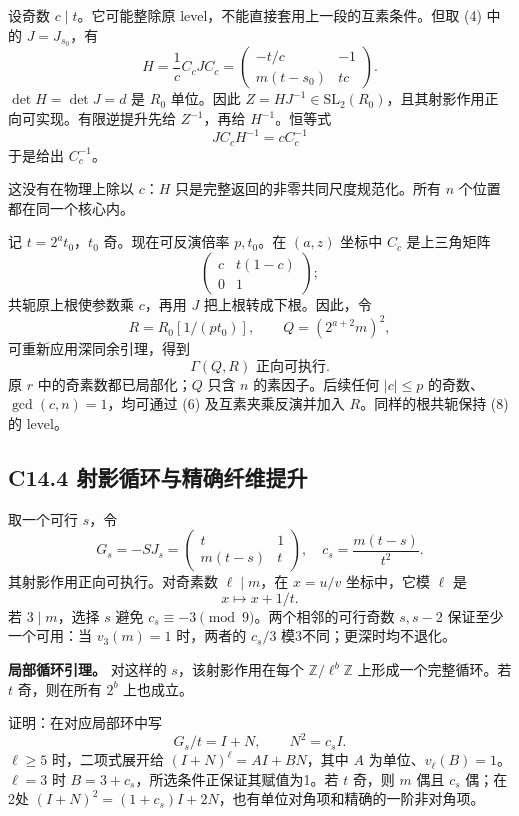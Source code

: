 \documentclass[11pt,a4paper]{article}
\theoremstyle{definition}
\numberwithin{equation}{section}
\begin{document}
{设奇数} \(c\mid t\){。它可能整除原} {level，不能直接套用上一段的互素条件。但取} {(4)} {中的} \(J=J_{s_0}\){，有} \[
H=\frac1c C_cJC_c
=\begin{pmatrix}-t/c&-1\\m(t-s_0)&tc\end{pmatrix}.
\] \(\det H=\det J=d\) {是} \(R_0\) {单位。因此} \(Z=HJ^{-1}\in\mathrm{SL}_2(R_0)\){，且其射影作用正向可实现。有限逆提升先给} \(Z^{-1}\){，再给} \(H^{-1}\){。恒等式} \[
JC_cH^{-1}=cC_c^{-1}\tag{C14.7}
\] {于是给出} \(C_c^{-1}\){。}

{这没有在物理上除以} \(c\){：}\(H\) {只是完整返回的非零共同尺度规范化。所有} \(n\) {个位置都在同一个核心内。}

{记} \(t=2^a t_0\){，}\(t_0\) {奇。现在可反演倍率} \(p,t_0\){。在} \((a,z)\) {坐标中} \(C_c\) {是上三角矩阵} \[
\begin{pmatrix}c&t(1-c)\\0&1\end{pmatrix};
\] {共轭原上根使参数乘} \(c\){，再用} \(J\) {把上根转成下根。因此，令} \[
R=R_0[1/(pt_0)],\qquad Q=(2^{a+2}m)^2,
\] {可重新应用深同余引理，得到} \[
\boxed{\Gamma(Q,R)\text{ 正向可执行}.}\tag{C14.8}
\] {原} \(r\) {中的奇素数都已局部化；}\(Q\) {只含} \(n\) {的素因子。后续任何} \(|c|\le p\) {的奇数、}\(\gcd(c,n)=1\){，均可通过} {(6)} {及互素夹乘反演并加入} \(R\){。同样的根共轭保持} {(8)} {的} {level。}

\subsection*{\texorpdfstring{{C14.4} {射影循环与精确纤维提升}}{C14.4 射影循环与精确纤维提升}}\label{C14-h96}

{取一个可行} \(s\){，令} \[
G_s=-SJ_s=\begin{pmatrix}t&1\\m(t-s)&t\end{pmatrix},
\quad c_s=\frac{m(t-s)}{t^2}.
\] {其射影作用正向可执行。对奇素数} \(\ell\mid m\){，在} \(x=u/v\) {坐标中，它模} \(\ell\) {是} \[
x\mapsto x+1/t.
\] {若} \(3\mid m\){，选择} \(s\) {避免} \(c_s\equiv-3\pmod9\){。两个相邻的可行奇数} \(s,s-2\) {保证至少一个可用：当} \(v_3(m)=1\) {时，两者的} \(c_s/3\) {模3不同；更深时均不退化。}

\textbf{{局部循环引理。}} {对这样的} \(s\){，该射影作用在每个} \(\mathbb Z/\ell^b\mathbb Z\) {上形成一个完整循环。若} \(t\) {奇，则在所有} \(2^b\) {上也成立。}

{证明：在对应局部环中写} \[
G_s/t=I+N,\qquad N^2=c_s I.
\] \(\ell\ge5\) {时，二项式展开给} \((I+N)^\ell=A I+B N\){，其中} \(A\) {为单位、}\(v_\ell(B)=1\){。}\(\ell=3\) {时} \(B=3+c_s\){，所选条件正保证其赋值为1。若} \(t\) {奇，则} \(m\) {偶且} \(c_s\) {偶；在2处} \((I+N)^2=(1+c_s)I+2N\){，也有单位对角项和精确的一阶非对角项。}
\end{document}
